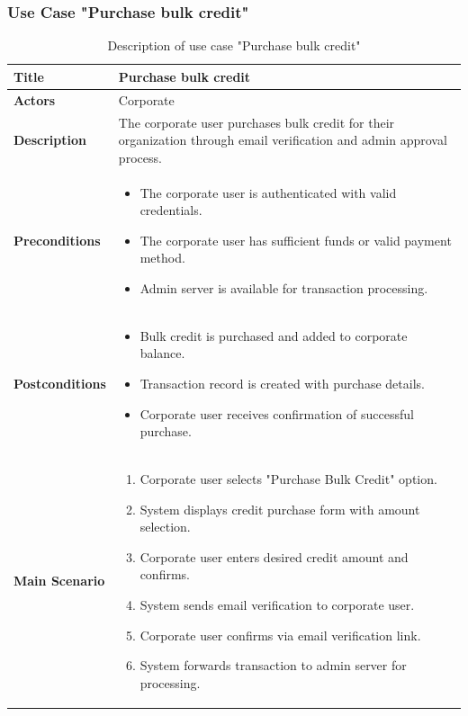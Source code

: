\subsubsection{Use Case "Purchase bulk credit"}
\begin{longtable}{|p{}|p{}|}

  \caption{Description of use case "Purchase bulk credit"}
  \label{tab:uc_purchase_bulk_credit} \\
  \hline
  \textbf{Title} & Purchase bulk credit \\ \hline
  \textbf{Actors} & Corporate \\ \hline
  \textbf{Description} & The corporate user purchases bulk credit for their organization through email verification and admin approval process. \\ \hline
  \textbf{Preconditions} & 
    \begin{itemize}[nosep,leftmargin=*]
      \item The corporate user is authenticated with valid credentials.
      \item The corporate user has sufficient funds or valid payment method.
      \item Admin server is available for transaction processing.
    \end{itemize} \\ \hline
  \textbf{Postconditions} & 
    \begin{itemize}[nosep,leftmargin=*]
      \item Bulk credit is purchased and added to corporate balance.
      \item Transaction record is created with purchase details.
      \item Corporate user receives confirmation of successful purchase.
    \end{itemize} \\ \hline
  \textbf{Main Scenario} &
    \begin{enumerate}[nosep,leftmargin=*]
      \item Corporate user selects "Purchase Bulk Credit" option.
      \item System displays credit purchase form with amount selection.
      \item Corporate user enters desired credit amount and confirms.
      \item System sends email verification to corporate user.
      \item Corporate user confirms via email verification link.
      \item System forwards transaction to admin server for processing.

\end{enumerate}
\end{longtable}
